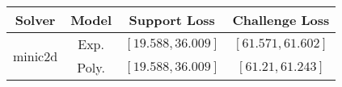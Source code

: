 \begin{tabular}{cc|c|c} 
\hline 
 Solver & Model & Support Loss  & Challenge Loss \tabularnewline\hline 
\hline 
\multirow{2}{*}{minic2d} & Exp. & $\left[19.588,36.009\right]$ & $\left[61.571,61.602\right]$ \tabularnewline 
 & Poly. & $\mathbf{\left[19.588,36.009\right]}$ & $\mathbf{\left[61.21,61.243\right]}$ \tabularnewline 
\hline 
\end{tabular} 

